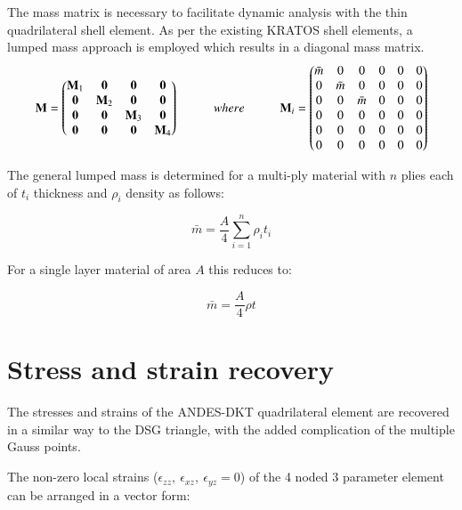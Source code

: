 The mass matrix is necessary to facilitate dynamic analysis with the thin quadrilateral shell element. As per the existing KRATOS shell elements, a lumped mass approach is employed which results in a diagonal mass matrix.
\begin{equation} 
\mathbf{M} =  
\begin{pmatrix}
\mathbf{M}_1 & \mathbf{0} & \mathbf{0} & \mathbf{0}\\
\mathbf{0} & \mathbf{M}_2 & \mathbf{0} & \mathbf{0}\\
\mathbf{0} & \mathbf{0} & \mathbf{M}_3 & \mathbf{0}\\
\mathbf{0} &\mathbf{0} & \mathbf{0} & \mathbf{M}_4
\end{pmatrix}
\hspace{10mm}
where
\hspace{10mm}
\mathbf{M}_i =  
\begin{pmatrix}
\bar{m} & 0 & 0 & 0 & 0 & 0\\
0 & \bar{m} & 0 & 0 & 0 & 0\\
0 & 0 & \bar{m} &0 & 0 & 0\\
0 & 0 & 0 & 0 & 0 & 0\\
0 & 0 & 0 & 0 & 0 & 0\\
0 & 0 & 0 & 0 & 0 & 0
\end{pmatrix}
\label{eqt15}
\end{equation}

The general lumped mass is determined for a multi-ply material with $n$ plies each of $t_i$ thickness and $\rho_i$ density as follows:

\begin{equation} 
\bar{m} = \frac{A}{4} \sum_{i=1}^n \rho_i t_i
\label{eqt16}
\end{equation}

For a single layer material of area $A$ this reduces to:

\begin{equation} 
\bar{m} = \frac{A}{4} \rho t
\label{eqt17}
\end{equation}

\section{Stress and strain recovery}

The stresses and strains of the ANDES-DKT quadrilateral element are recovered in a similar way to the DSG triangle, with the added complication of the multiple Gauss points.

The non-zero local strains ($\epsilon_{zz},\ \epsilon_{xz},\ \epsilon_{yz} = 0$) of the 4 noded 3 parameter element can be arranged in a vector form:

